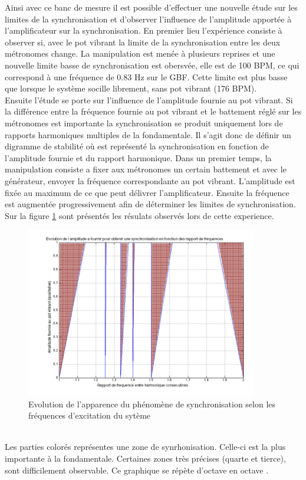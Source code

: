 \documentclass[a4paper,11pt]{report}
\begin{document}
Ainsi avec ce banc de mesure il est possible d'effectuer une nouvelle étude sur les limites de la synchronisation et d'observer l'influence de l'amplitude apportée à l'amplificateur sur la synchronisation. En premier lieu l'expérience consiste à observer si, avec le pot vibrant la limite de la synchronisation entre les deux métronomes change. La manipulation est menée à plusieurs reprises et une nouvelle limite basse de synchronisation est obersvée, elle est de 100 BPM, ce qui correspond à une fréquence de 0.83 Hz sur le GBF. Cette limite est plus basse que lorsque le système socille librement, sans pot vibrant (176 BPM).\\

Ensuite l'étude se porte sur l'influence de l'amplitude fournie au pot vibrant. Si la différence entre la fréquence fournie au pot vibrant et le battement réglé sur les métronomes est importante la synchronisation se produit uniquement lors de rapports harmoniques multiples de la fondamentale. Il s'agit donc de définir un digramme de stabilité où est représenté la synchronisation en fonction de l'amplitude fournie et du rapport harmonique. Dans un premier temps, la manipulation consiste a fixer aux métronomes un certain battement et avec le générateur, envoyer la fréquence correspondante au pot vibrant. L'amplitude est fixée au maximum de ce que peut délivrer l'amplificateur. Ensuite la fréquence est augmentée progressivement afin de déterminer les limites de synchronisation. Sur la figure \ref{Arnold} sont présentés les résulats observés lors de cette experience.
\begin{figure}[h]
\centering
\includegraphics[width=0.9\textwidth]{Arnold_tongues_exp_trait}
\caption{Evolution de l'apparence du phénomène de synchronisation selon les fréquences d'excitation du sytème}\label{Arnold}
\end{figure}\\
Les parties colorés représentes une zone de synrhonisation. Celle-ci est la plus importante à la fondamentale. Certaines zones très précises (quarte et tierce), sont difficilement observable. Ce graphique se répète d'octave en octave \cite{panta}.
\newpage
\null
\thispagestyle{empty}
\end{document}

